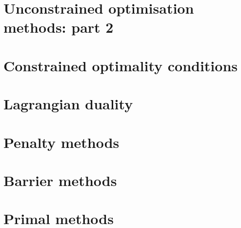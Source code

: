 \documentclass{bookest}
\begin{document}
	\chapter{Unconstrained optimisation methods: part 2}
	
	
	\chapter{Constrained optimality conditions}
		
	
	\chapter{Lagrangian duality}
		
	
	\chapter{Penalty methods}
	
	
	\chapter{Barrier methods}
	
	
	\chapter{Primal methods}
	
	
\end{document}
